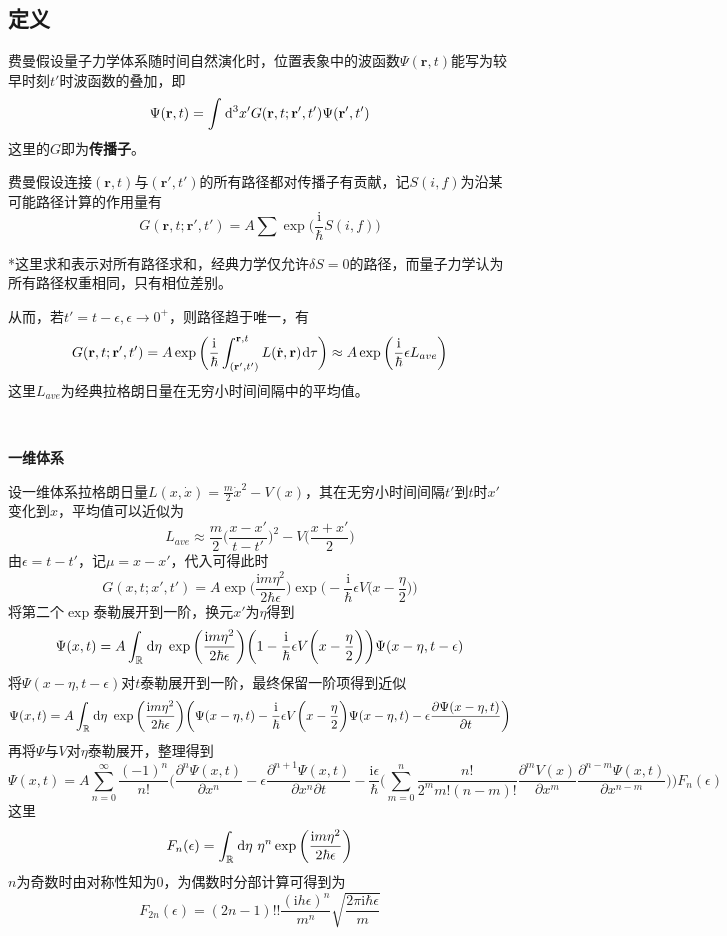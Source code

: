 \documentclass[a4paper,UTF8,fontset=windows]{ctexart}
\newcommand*{\dr}{\hspace{0.07em}\mathrm{d}}
\newcommand*{\ir}{\mathrm{i}}
\newcommand*{\br}{\mathbf{r}}
\begin{document}
\subsection{定义}
费曼假设量子力学体系随时间自然演化时，位置表象中的波函数$\Psi(\br,t)$能写为较早时刻$t'$时波函数的叠加，即
$$\Psi(\br,t)=\int\dr^3x'G(\br,t;\br',t')\Psi(\br',t')$$
这里的$G$即为\textbf{传播子}。

费曼假设连接$(\br,t)$与$(\br',t')$的所有路径都对传播子有贡献，记$S(i,f)$为沿某可能路径计算的作用量有
$$G(\br,t;\br',t')=A\sum\exp\bigg(\frac{\ir}{\hbar}S(i,f)\bigg)$$

*这里求和表示对所有路径求和，经典力学仅允许$\delta S=0$的路径，而量子力学认为所有路径权重相同，只有相位差别。

从而，若$t'=t-\epsilon,\epsilon\to 0^+$，则路径趋于唯一，有
$$G(\br,t;\br',t')=A\exp\bigg(\frac{\ir}{\hbar}\int_{(\br',t')}^{\br,t}L(\dot{\br},\br)\dr\tau\bigg)\approx A\exp\bigg(\frac{\ir}{\hbar}\epsilon L_{ave}\bigg)$$
这里$L_{ave}$为经典拉格朗日量在无穷小时间间隔中的平均值。

\

\textbf{一维体系}

设一维体系拉格朗日量$L(x,\dot{x})=\frac{m}{2}\dot{x}^2-V(x)$，其在无穷小时间间隔$t'$到$t$时$x'$变化到$x$，平均值可以近似为
$$L_{ave}\approx\frac{m}{2}\bigg(\frac{x-x'}{t-t'}\bigg)^2-V\bigg(\frac{x+x'}{2}\bigg)$$
由$\epsilon=t-t'$，记$\mu=x-x'$，代入可得此时
$$G(x,t;x',t')=A\exp\bigg(\frac{\ir m\eta^2}{2\hbar\epsilon}\bigg)\exp\bigg(-\frac{\ir}{\hbar}\epsilon V\bigg(x-\frac{\eta}{2}\bigg)\bigg)$$
将第二个$\exp$泰勒展开到一阶，换元$x'$为$\eta$得到
$$\Psi(x,t)=A\int_\mathbb{R}\dr\eta\ \exp\bigg(\frac{\ir m\eta^2}{2\hbar\epsilon}\bigg)\bigg(1-\frac{\ir}{\hbar}\epsilon V\bigg(x-\frac{\eta}{2}\bigg)\bigg)\Psi(x-\eta,t-\epsilon)$$
将$\Psi(x-\eta,t-\epsilon)$对$t$泰勒展开到一阶，最终保留一阶项得到近似
$$\Psi(x,t)=A\int_\mathbb{R}\dr\eta\ \exp\bigg(\frac{\ir m\eta^2}{2\hbar\epsilon}\bigg)\bigg(\Psi(x-\eta,t)-\frac{\ir}{\hbar}\epsilon V\bigg(x-\frac{\eta}{2}\bigg)\Psi(x-\eta,t)-\epsilon\frac{\partial\Psi(x-\eta,t)}{\partial t}\bigg)$$
再将$\Psi$与$V$对$\eta$泰勒展开，整理得到
$$\Psi(x,t)=A\sum_{n=0}^\infty\frac{(-1)^n}{n!}\bigg(\frac{\partial^n\Psi(x,t)}{\partial x^n}-\epsilon\frac{\partial^{n+1}\Psi(x,t)}{\partial x^n\partial t}-\frac{\ir\epsilon}{\hbar}\bigg(\sum_{m=0}^n\frac{n!}{2^mm!(n-m)!}\frac{\partial^mV(x)}{\partial x^m}\frac{\partial^{n-m}\Psi(x,t)}
{\partial x^{n-m}}\bigg)\bigg)F_n(\epsilon)$$
这里
$$F_n(\epsilon)=\int_\mathbb{R}\dr\eta\ \eta^n\exp\bigg(\frac{\ir m\eta^2}{2\hbar\epsilon}\bigg)$$
$n$为奇数时由对称性知为0，为偶数时分部计算可得到为
$$F_{2n}(\epsilon)=(2n-1)!!\frac{(\ir h\epsilon)^n}{m^n}\sqrt{\frac{2\pi\ir\hbar\epsilon}{m}}$$
\end{document}
